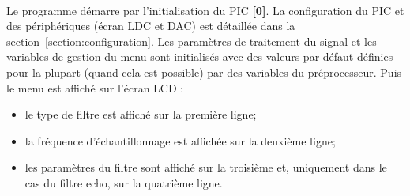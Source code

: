 \documentclass{article}
\begin{document}
    \paragraph{}
    Le programme démarre par l'initialisation du PIC \textbf{[0]}. La configuration du PIC et des périphériques (écran LDC et DAC) est détaillée dans la section~\ref{section:configuration}. Les paramètres de traitement du signal et les variables de gestion du menu sont initialisés avec des valeurs par défaut définies pour la plupart (quand cela est possible) par des variables du préprocesseur. Puis le menu est affiché sur l'écran LCD :
    \begin{itemize}
        \item le type de filtre est affiché sur la première ligne;
        \item la fréquence d'échantillonnage est affichée sur la deuxième ligne;
        \item les paramètres du filtre sont affiché sur la troisième et, uniquement dans le cas du filtre echo, sur la quatrième ligne.
    \end{itemize}
\end{document}

